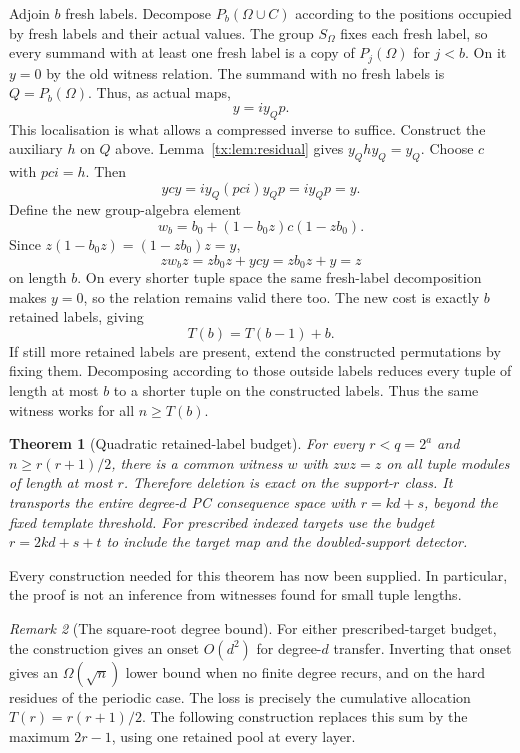 \documentclass[11pt,a4paper,oneside,openany]{book}
\newtheorem{theorem}{Theorem}[chapter]
\theoremstyle{definition}\newtheorem{definition}[theorem]{Definition}
\theoremstyle{remark}\newtheorem{remark}[theorem]{Remark}
\numberwithin{equation}{chapter}
\begin{document}
Adjoin $b$ fresh labels. Decompose $P_b(\Omega\cup C)$ according to the positions occupied by fresh labels and their actual values. The group $S_\Omega$ fixes each fresh label, so every summand with at least one fresh label is a copy of $P_j(\Omega)$ for $j<b$. On it $y=0$ by the old witness relation. The summand with no fresh labels is $Q=P_b(\Omega)$. Thus, as actual maps,
\[y=i y_Q p.\]
This localisation is what allows a compressed inverse to suffice. Construct the auxiliary $h$ on $Q$ above. Lemma~\ref{tx:lem:residual} gives $y_Qhy_Q=y_Q$. Choose $c$ with $pci=h$. Then
\[ycy=i y_Q(pci)y_Qp=i y_Qp=y.\]
Define the new group-algebra element
\[w_b=b_0+(1-b_0z)c(1-zb_0).\]
Since $z(1-b_0z)=(1-zb_0)z=y$,
\[zw_bz=zb_0z+ycy=zb_0z+y=z\]
on length $b$. On every shorter tuple space the same fresh-label decomposition makes $y=0$, so the relation remains valid there too. The new cost is exactly $b$ retained labels, giving
\[T(b)=T(b-1)+b.\]
If still more retained labels are present, extend the constructed permutations by fixing them. Decomposing according to those outside labels reduces every tuple of length at most $b$ to a shorter tuple on the constructed labels. Thus the same witness works for all $n\ge T(b)$.

\begin{theorem}[Quadratic retained-label budget]
For every $r<q=2^a$ and $n\ge r(r+1)/2$, there is a common witness $w$ with $zwz=z$ on all tuple modules of length at most $r$. Therefore deletion is exact on the support-$r$ class. It transports the
entire degree-$d$ PC consequence space with $r=kd+s$, beyond the fixed
template threshold. For prescribed indexed targets use the budget
$r=2kd+s+t$ to include the target map and the doubled-support detector.
\end{theorem}
Every construction needed for this theorem has now been supplied. In particular, the proof is not an inference from witnesses found for small tuple lengths.


\begin{remark}[The square-root degree bound]
For either prescribed-target budget, the construction gives an onset
$O(d^2)$ for degree-$d$ transfer.
Inverting that onset gives an $\Omega(\sqrt n)$ lower bound when no
finite degree recurs, and on the hard residues of the periodic case.
The loss is precisely the cumulative allocation $T(r)=r(r+1)/2$.
The following construction replaces this sum by the maximum $2r-1$,
using one retained pool at every layer.
\end{remark}
\end{document}
